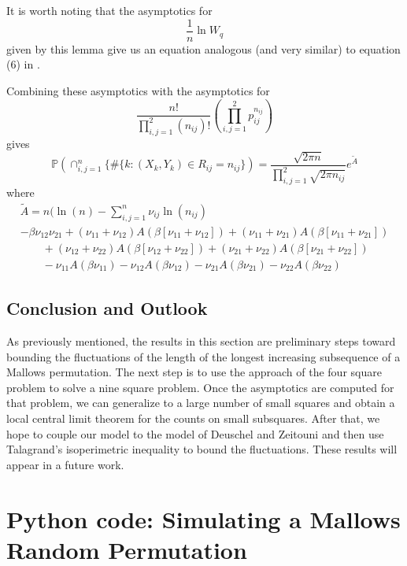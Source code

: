 \documentclass[12pt]{report}
\theoremstyle{definition}
\begin{document}
It is worth noting that the asymptotics for 
$$
\frac{1}{n}\ln W_q
$$
given by this lemma give us an equation analogous (and very similar) to equation (6) in \cite{starrWal}.  

Combining these asymptotics with the asymptotics for
$$
\frac{n!}{\prod_{i,j=1}^2 (n_{ij})!}\left(\prod_{i,j=1}^2 p_{ij}^{n_{ij}}\right)
$$
gives
\begin{equation}
\mathbb{P}\left(\cap_{i,j=1}^n \{\# \{k:(X_k,Y_k)\in R_{ij}=n_{ij}\}\right)=\frac{\sqrt{2\pi n}}{\prod_{i,j=1}^2 \sqrt{2\pi n_{ij}}}e^{\tilde{A}}
\end{equation}
where 
\begin{multline}
\tilde{A}=n(\ln(n)-\sum_{i,j=1}^n\nu_{ij}\ln(n_{ij}) \\ -\beta \nu_{12} \nu_{21} + (\nu_{11}+\nu_{12}) A(\beta[\nu_{11}+\nu_{12}]) 
+ (\nu_{11}+\nu_{21}) A(\beta[\nu_{11}+\nu_{21}])\\
\qquad + (\nu_{12}+\nu_{22}) A(\beta[\nu_{12}+\nu_{22}])
+ (\nu_{21}+\nu_{22}) A(\beta[\nu_{21}+\nu_{22}])\\
\qquad - \nu_{11} A(\beta \nu_{11})
- \nu_{12} A(\beta \nu_{12})
- \nu_{21} A(\beta \nu_{21})
- \nu_{22} A(\beta \nu_{22})
\end{multline}


\section{Conclusion and Outlook}
As previously mentioned, the results in this section are preliminary steps toward bounding the fluctuations of the length of the longest increasing subsequence of a Mallows permutation.  The next step is to use the approach of the four square problem to solve a nine square problem. Once the asymptotics are computed for that problem, we can generalize to a large number of small squares and obtain a local central limit theorem for the counts on small subsquares.  After that, we hope to couple our model to the model of Deuschel and Zeitouni \cite{DZ} and then use Talagrand's isoperimetric inequality to bound the fluctuations.  These results will appear in a future work.  

\appendix  
\chapter{Python code: Simulating a Mallows Random Permutation}

\end{document}
